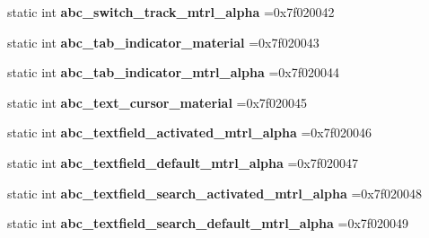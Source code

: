\begin{DoxyCompactItemize}
static int {\bfseries abc\+\_\+switch\+\_\+track\+\_\+mtrl\+\_\+alpha} =0x7f020042
\item 
\mbox{\label{classandroid_1_1support_1_1v7_1_1appcompat_1_1R_1_1drawable_a5f26d5d3577218bac2d13c4015eb0945}} 
static int {\bfseries abc\+\_\+tab\+\_\+indicator\+\_\+material} =0x7f020043
\item 
\mbox{\label{classandroid_1_1support_1_1v7_1_1appcompat_1_1R_1_1drawable_a06413f87f3c39a1cc3bb9990798ce1ed}} 
static int {\bfseries abc\+\_\+tab\+\_\+indicator\+\_\+mtrl\+\_\+alpha} =0x7f020044
\item 
\mbox{\label{classandroid_1_1support_1_1v7_1_1appcompat_1_1R_1_1drawable_a8c90beeb63e03e08e0117fa9aedf7c7e}} 
static int {\bfseries abc\+\_\+text\+\_\+cursor\+\_\+material} =0x7f020045
\item 
\mbox{\label{classandroid_1_1support_1_1v7_1_1appcompat_1_1R_1_1drawable_a814ec1ff5be98a912c85c0404ea3bacd}} 
static int {\bfseries abc\+\_\+textfield\+\_\+activated\+\_\+mtrl\+\_\+alpha} =0x7f020046
\item 
\mbox{\label{classandroid_1_1support_1_1v7_1_1appcompat_1_1R_1_1drawable_a834f0108762edae6c5f47f735d91217f}} 
static int {\bfseries abc\+\_\+textfield\+\_\+default\+\_\+mtrl\+\_\+alpha} =0x7f020047
\item 
\mbox{\label{classandroid_1_1support_1_1v7_1_1appcompat_1_1R_1_1drawable_ae4f89a0a78aef433a49243d487cd4552}} 
static int {\bfseries abc\+\_\+textfield\+\_\+search\+\_\+activated\+\_\+mtrl\+\_\+alpha} =0x7f020048
\item 
\mbox{\label{classandroid_1_1support_1_1v7_1_1appcompat_1_1R_1_1drawable_a257e80ad5ea25d3168aefaf899e59cec}} 
static int {\bfseries abc\+\_\+textfield\+\_\+search\+\_\+default\+\_\+mtrl\+\_\+alpha} =0x7f020049
\item 
\mbox{\label{classandroid_1_1support_1_1v7_1_1appcompat_1_1R_1_1drawable_a5bdaa05ed1cdb335fc9e9b85dabb699a}} 

\end{DoxyCompactItemize}
